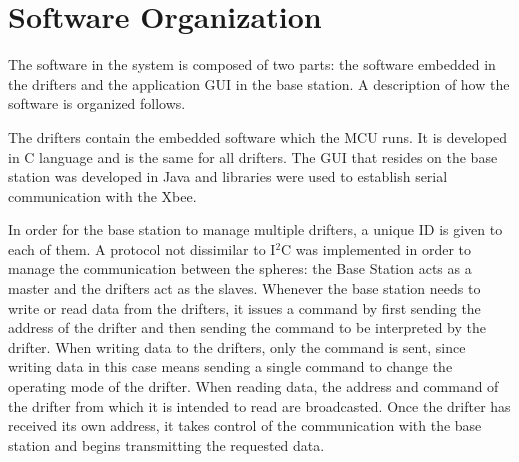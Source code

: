 \section{Software Organization}
The software in the system is composed of two parts: the software embedded in the drifters and the application GUI in the base station.  A description of how the software is organized follows.

The drifters contain the embedded software which the MCU runs.  It is developed in C language and is the same for all drifters.  The GUI that resides on the base station was developed in Java and libraries were used to establish serial communication with the Xbee.

In order for the base station to manage multiple drifters, a unique ID is given to each of them.  A protocol not dissimilar to I$^2$C was implemented in order to manage the communication between the spheres: the Base Station acts as a master and the drifters act as the slaves.  Whenever the base station needs to write or read data from the drifters, it issues a command by first sending the address of the drifter and then sending the command to be interpreted by the drifter.  When writing data to the drifters, only the command is sent, since writing data in this case means sending a single command to change the operating mode of the drifter.  When reading data, the address and command of the drifter from which it is intended to read are broadcasted.  Once the drifter has received its own address, it takes control of the communication with the base station and begins transmitting the requested data.

